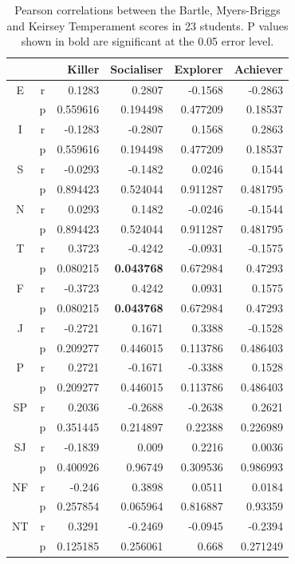 \documentclass[12pt,a4paper,twoside]{report}
\begin{document}
\begin{table}
\begin{center}
\begin{tabular}{|c|c|r|r|r|r|}
	\hline  &  & Killer & Socialiser & Explorer & Achiever \\ 
	\hline E & r & 0.1283
	& 0.2807 & -0.1568 & -0.2863
	\\ 
	\hline  & p & 0.559616
	& 0.194498
	& 0.477209
	& 0.18537
	\\ 
	\hline I & r & -0.1283
	& -0.2807
	& 0.1568
	& 0.2863
	\\ 
	\hline  & p & 0.559616
	& 0.194498
	& 0.477209
	& 0.18537
	\\ 
	\hline S & r & -0.0293
	&  -0.1482
	& 0.0246
	& 0.1544
	\\ 
	\hline  & p & 0.894423
	& 0.524044
	& 0.911287
	& 0.481795
	\\ 
	\hline N & r & 0.0293
	&  0.1482
	& -0.0246
	& -0.1544
	\\ 
	\hline  & p & 0.894423
	& 0.524044
	& 0.911287
	& 0.481795
	\\ 
	\hline T & r & 0.3723
	& -0.4242
	& -0.0931
	& -0.1575
	\\ 
	\hline  & p & 0.080215
	& \textbf{0.043768}
	& 0.672984
	& 0.47293
	\\ 
	\hline F & r & -0.3723
	& 0.4242
	& 0.0931
	& 0.1575
	\\ 
	\hline  & p & 0.080215
	& \textbf{0.043768}
	& 0.672984
	& 0.47293
	\\ 
	\hline J & r & -0.2721
	& 0.1671
	& 0.3388
	& -0.1528
	\\ 
	\hline  & p & 0.209277
	& 0.446015
	& 0.113786
	& 0.486403
	\\ 
	\hline P & r & 0.2721
	& -0.1671
	& -0.3388
	& 0.1528
	\\ 
	\hline  & p & 0.209277
	& 0.446015
	& 0.113786
	& 0.486403
	\\ 
	\hline SP & r & 0.2036
	& -0.2688
	& -0.2638
	& 0.2621
	\\ 
	\hline  & p & 0.351445
	& 0.214897
	& 0.22388
	& 0.226989
	\\ 
	\hline SJ & r & -0.1839
	& 0.009
	& 0.2216
	& 0.0036
	\\ 
	\hline  & p & 0.400926
	& 0.96749
	& 0.309536
	& 0.986993
	\\ 
	\hline NF & r & -0.246
	& 0.3898
	& 0.0511
	& 0.0184
	\\ 
	\hline  & p & 0.257854
	& 0.065964
	& 0.816887
	& 0.93359
	\\ 
	\hline NT & r & 0.3291
	& -0.2469
	& -0.0945
	& -0.2394
	\\ 
	\hline  & p & 0.125185
	& 0.256061
	& 0.668
	& 0.271249
	\\ 
	\hline 
\end{tabular}
\caption{Pearson correlations between the Bartle, Myers-Briggs and Keirsey Temperament scores in 23 students. P values shown in bold are significant at the 0.05 error level.}
\label{results}
\end{center}
\end{table}
\end{document}
